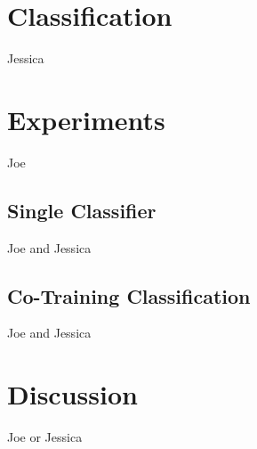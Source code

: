 \documentclass[twoside]{article}
\begin{document}
\begin{multicols}{2}

\section{Classification}
Jessica


\section{Experiments}
Joe

\subsection{Single Classifier}
Joe and Jessica

\subsection{Co-Training Classification}
Joe and Jessica


\section{Discussion}
Joe or Jessica





\end{multicols}
\end{document}
